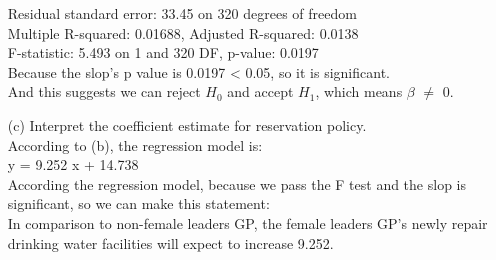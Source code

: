 \documentclass[12pt,letterpaper]{article}
\begin{document}
\begin{enumerate}
	Residual standard error: 33.45 on 320 degrees of freedom \\
	Multiple R-squared:  0.01688,	Adjusted R-squared:  0.0138  \\
	F-statistic: 5.493 on 1 and 320 DF,  p-value: 0.0197 \\
	
	Because the slop's p value is 0.0197 < 0.05, so it is significant.\\
	
	And this suggests we can reject $H_0$ and accept $H_1$, which means $\beta$ $\neq$ 0.

	
	\newpage
	\item [(c)] Interpret the coefficient estimate for reservation policy. \\
	
	According to (b), the regression model is: \\
	
	y = 9.252 x + 14.738 \\
	
	According the regression model, because we pass the F test and the slop is significant, so we can make this statement:\\
	
	In comparison to non-female leaders GP, the female leaders GP's newly repair drinking water facilities will expect to increase 9.252. \\
	
\end{enumerate}
\end{document}
